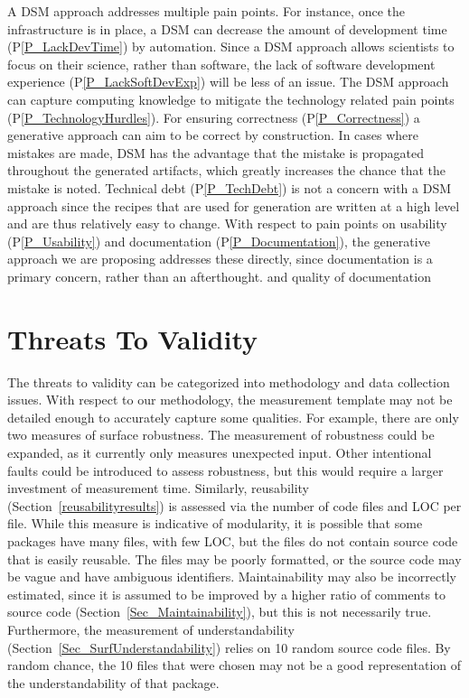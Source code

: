\documentclass[final, 3p, times, authoryear]{elsarticle}
\newcommand{\ppref}[1]{P\ref{#1}}
\begin{document}
A DSM approach addresses multiple pain points.  For instance, once the
infrastructure is in place, a DSM can decrease the amount of development time
(\ppref{P_LackDevTime}) by automation.  Since a DSM approach allows scientists
to focus on their science, rather than software, the lack of software
development experience (\ppref{P_LackSoftDevExp}) will be less of an issue. The
DSM approach can capture computing knowledge to mitigate the technology related
pain points (\ppref{P_TechnologyHurdles}).  For ensuring correctness
(\ppref{P_Correctness}) a generative approach can aim to be correct by
construction.  In cases where mistakes are made, DSM has the advantage that the
mistake is propagated throughout the generated artifacts, which greatly
increases the chance that the mistake is noted.  Technical debt
(\ppref{P_TechDebt}) is not a concern with a DSM approach since the recipes that
are used for generation are written at a high level and are thus relatively easy
to change.  With respect to pain points on usability (\ppref{P_Usability}) and
documentation (\ppref{P_Documentation}), the generative approach we are
proposing addresses these directly, since documentation is a primary concern,
rather than an afterthought. and quality of documentation 

\section{Threats To Validity} \label{threats}

The threats to validity can be categorized into methodology and data collection
issues.  With respect to our methodology, the measurement template may not be
detailed enough to accurately capture some qualities. For example, there are
only two measures of surface robustness. The measurement of robustness could be
expanded, as it currently only measures unexpected input. Other intentional
faults could be introduced to assess robustness, but this would require a larger
investment of measurement time. Similarly, reusability
(Section~\ref{reusabilityresults}) is assessed via the number of code files and
LOC per file. While this measure is indicative of modularity, it is possible
that some packages have many files, with few LOC, but the files do not contain
source code that is easily reusable. The files may be poorly formatted, or the
source code may be vague and have ambiguous identifiers. Maintainability may
also be incorrectly estimated, since it is assumed to be improved by a higher
ratio of comments to source code (Section~\ref{Sec_Maintainability}), but this
is not necessarily true. Furthermore, the measurement of understandability
(Section~\ref{Sec_SurfUnderstandability}) relies on 10 random source code files.
By random chance, the 10 files that were chosen may not be a good representation
of the understandability of that package. 
\end{document}
